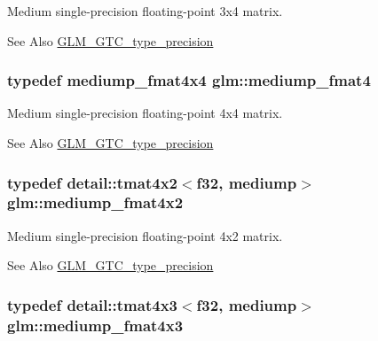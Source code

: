 Medium single-\/precision floating-\/point 3x4 matrix. \begin{DoxySeeAlso}{See Also}
\hyperlink{group__gtc__type__precision}{G\-L\-M\-\_\-\-G\-T\-C\-\_\-type\-\_\-precision} 
\end{DoxySeeAlso}
\hypertarget{group__gtc__type__precision_ga6cd3ae1f3509b79061edcc83564769d4}{
\subsubsection[{mediump\-\_\-fmat4}]{\setlength{\rightskip}{0pt plus 5cm}typedef mediump\-\_\-fmat4x4 {\bf glm\-::mediump\-\_\-fmat4}}}\label{group__gtc__type__precision_ga6cd3ae1f3509b79061edcc83564769d4}
Medium single-\/precision floating-\/point 4x4 matrix. \begin{DoxySeeAlso}{See Also}
\hyperlink{group__gtc__type__precision}{G\-L\-M\-\_\-\-G\-T\-C\-\_\-type\-\_\-precision} 
\end{DoxySeeAlso}
\hypertarget{group__gtc__type__precision_ga09a2851d38fe3cf52735a1d26199bdcc}{
\subsubsection[{mediump\-\_\-fmat4x2}]{\setlength{\rightskip}{0pt plus 5cm}typedef detail\-::tmat4x2$<$f32, mediump$>$ {\bf glm\-::mediump\-\_\-fmat4x2}}}\label{group__gtc__type__precision_ga09a2851d38fe3cf52735a1d26199bdcc}
Medium single-\/precision floating-\/point 4x2 matrix. \begin{DoxySeeAlso}{See Also}
\hyperlink{group__gtc__type__precision}{G\-L\-M\-\_\-\-G\-T\-C\-\_\-type\-\_\-precision} 
\end{DoxySeeAlso}
\hypertarget{group__gtc__type__precision_ga5e5de428d1e1da2c593a6245d92dd8c0}{
\subsubsection[{mediump\-\_\-fmat4x3}]{\setlength{\rightskip}{0pt plus 5cm}typedef detail\-::tmat4x3$<$f32, mediump$>$ {\bf glm\-::mediump\-\_\-fmat4x3}}}\label{group__gtc__type__precision_ga5e5de428d1e1da2c593a6245d92dd8c0}

